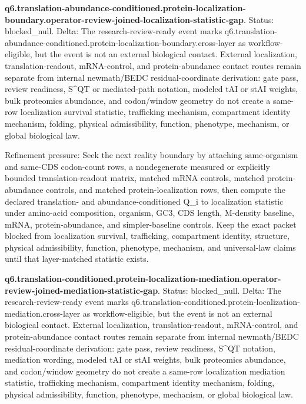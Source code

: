 \textbf{q6.translation-abundance-conditioned.protein-localization-boundary.operator-review-joined-localization-statistic-gap}. Status: blocked\_null. Delta: The research-review-ready event marks q6.translation-abundance-conditioned.protein-localization-boundary.cross-layer as workflow-eligible, but the event is not an external biological contact. External localization, translation-readout, mRNA-control, and protein-abundance contact routes remain separate from internal newmath/BEDC residual-coordinate derivation: gate pass, review readiness, S\textasciicircum{}QT or mediated-path notation, modeled tAI or stAI weights, bulk proteomics abundance, and codon/window geometry do not create a same-row localization survival statistic, trafficking mechanism, compartment identity mechanism, folding, physical admissibility, function, phenotype, mechanism, or global biological law.

Refinement pressure: Seek the next reality boundary by attaching same-organism and same-CDS codon-count rows, a nondegenerate measured or explicitly bounded translation-readout matrix, matched mRNA controls, matched protein-abundance controls, and matched protein-localization rows, then compute the declared translation- and abundance-conditioned Q\_i to localization statistic under amino-acid composition, organism, GC3, CDS length, M-density baseline, mRNA, protein-abundance, and simpler-baseline controls. Keep the exact packet blocked from localization survival, trafficking, compartment identity, structure, physical admissibility, function, phenotype, mechanism, and universal-law claims until that layer-matched statistic exists.

\textbf{q6.translation-conditioned.protein-localization-mediation.operator-review-joined-mediation-statistic-gap}. Status: blocked\_null. Delta: The research-review-ready event marks q6.translation-conditioned.protein-localization-mediation.cross-layer as workflow-eligible, but the event is not an external biological contact. External localization, translation-readout, mRNA-control, and protein-abundance contact routes remain separate from internal newmath/BEDC residual-coordinate derivation: gate pass, review readiness, S\textasciicircum{}QT notation, mediation wording, modeled tAI or stAI weights, bulk proteomics abundance, and codon/window geometry do not create a same-row localization mediation statistic, trafficking mechanism, compartment identity mechanism, folding, physical admissibility, function, phenotype, mechanism, or global biological law.

